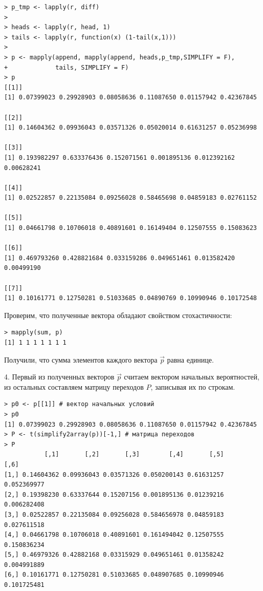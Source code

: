 \documentclass[14pt,a4paper]{scrartcl}
\begin{document}
\begin{verbatim}
> p_tmp <- lapply(r, diff)
> 
> heads <- lapply(r, head, 1)
> tails <- lapply(r, function(x) (1-tail(x,1)))
> 
> p <- mapply(append, mapply(append, heads,p_tmp,SIMPLIFY = F),
+             tails, SIMPLIFY = F)
> p
[[1]]
[1] 0.07399023 0.29928903 0.08058636 0.11087650 0.01157942 0.42367845

[[2]]
[1] 0.14604362 0.09936043 0.03571326 0.05020014 0.61631257 0.05236998

[[3]]
[1] 0.193982297 0.633376436 0.152071561 0.001895136 0.012392162 0.00628241

[[4]]
[1] 0.02522857 0.22135084 0.09256028 0.58465698 0.04859183 0.02761152

[[5]]
[1] 0.04661798 0.10706018 0.40891601 0.16149404 0.12507555 0.15083623

[[6]]
[1] 0.469793260 0.428821684 0.033159286 0.049651461 0.013582420 0.00499190

[[7]]
[1] 0.10161771 0.12750281 0.51033685 0.04890769 0.10990946 0.10172548
\end{verbatim}

Проверим, что полученные вектора обладают свойством стохастичности:

\begin{verbatim}
> mapply(sum, p)
[1] 1 1 1 1 1 1 1
\end{verbatim}

Получили, что сумма элементов каждого вектора $\vec{p}$ равна единице.

4. Первый из полученных векторов $\vec{p}$ считаем вектором начальных вероятностей, из остальных составляем матрицу переходов $P$, записывая их по строкам.

\begin{verbatim}
> p0 <- p[[1]] # вектор начальных условий
> p0
[1] 0.07399023 0.29928903 0.08058636 0.11087650 0.01157942 0.42367845
> P <- t(simplify2array(p))[-1,] # матрица переходов
> P
           [,1]       [,2]       [,3]        [,4]       [,5]        [,6]
[1,] 0.14604362 0.09936043 0.03571326 0.050200143 0.61631257 0.052369977
[2,] 0.19398230 0.63337644 0.15207156 0.001895136 0.01239216 0.006282408
[3,] 0.02522857 0.22135084 0.09256028 0.584656978 0.04859183 0.027611518
[4,] 0.04661798 0.10706018 0.40891601 0.161494042 0.12507555 0.150836234
[5,] 0.46979326 0.42882168 0.03315929 0.049651461 0.01358242 0.004991889
[6,] 0.10161771 0.12750281 0.51033685 0.048907685 0.10990946 0.101725481
\end{verbatim}

\pagebreak
\end{document}

